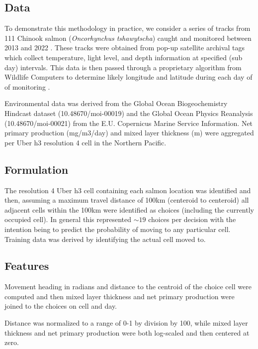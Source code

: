 \documentclass[11pt]{article}
\begin{document}
\subsection*{Data}

To demonstrate this methodology in practice, we consider a series of tracks from 111 Chinook salmon (\textit{Oncorhynchus tshawytscha}) caught and monitored between 2013 and 2022 \citep{tags1} \citep{tags2}. These tracks were obtained from pop-up satellite archival tags which collect temperature, light level, and depth information at specified (sub day) intervals. This data is then passed through a proprietary algorithm from Wildlife Computers to determine likely longitude and latitude during each day of of monitoring \citep{PSAT}. \newline

Environmental data was derived from the Global Ocean Biogeochemistry Hindcast dataset (10.48670/moi-00019) and the Global Ocean Physics Reanalysis (10.48670/moi-00021) from the E.U. Copernicus Marine Service Information. Net primary production (mg/m3/day) and mixed layer thickness (m) were aggregated per Uber h3 resolution 4 cell in the Northern Pacific. 

\subsection*{Formulation}

The resolution 4 Uber h3 cell containing each salmon location was identified and then, assuming a maximum travel distance of 100km (centeroid to centeroid) all adjacent cells within the 100km were identified as choices (including the currently occupied cell). In general this represented $\sim 19$ choices per decision with the intention being to predict the probability of moving to any particular cell. Training data was derived by identifying the actual cell moved to. 

\subsection*{Features} 

Movement heading in radians and distance to the centroid of the choice cell were computed and then mixed layer thickness and net primary production were joined to the choices on cell and day.

Distance was normalized to a range of 0-1 by division by 100, while mixed layer thickness and net primary production were both log-scaled and then centered at zero. 
\end{document}
